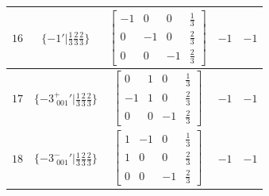 \documentclass[fleqn,8pt]{jsarticle}
\begin{document}
\begin{longtable}{ccccc}
$ 16 $ & $ \{-1{}'|\frac{1}{3} \frac{2}{3} \frac{2}{3}\} $ & $ \begin{bmatrix} -1 & 0 & 0 & \frac{1}{3} \\ 0 & -1 & 0 & \frac{2}{3} \\ 0 & 0 & -1 & \frac{2}{3} \end{bmatrix} $ & $ -1 $ & $ -1 $ \\ \hline
$ 17 $ & $ \{-3^{+}_{\,\,001}{}'|\frac{1}{3} \frac{2}{3} \frac{2}{3}\} $ & $ \begin{bmatrix} 0 & 1 & 0 & \frac{1}{3} \\ -1 & 1 & 0 & \frac{2}{3} \\ 0 & 0 & -1 & \frac{2}{3} \end{bmatrix} $ & $ -1 $ & $ -1 $ \\ \hline
$ 18 $ & $ \{-3^{-}_{\,\,001}{}'|\frac{1}{3} \frac{2}{3} \frac{2}{3}\} $ & $ \begin{bmatrix} 1 & -1 & 0 & \frac{1}{3} \\ 1 & 0 & 0 & \frac{2}{3} \\ 0 & 0 & -1 & \frac{2}{3} \end{bmatrix} $ & $ -1 $ & $ -1 $ \\
\end{longtable}
\end{document}
